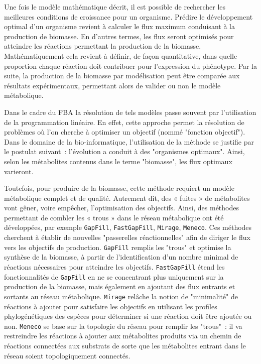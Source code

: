 \begin{refsegment}
    Une fois le modèle mathématique décrit, il est possible de rechercher les meilleures conditions de croissance pour un organisme. Prédire le développement optimal d’un organisme revient à calculer le flux maximum conduisant à la production de biomasse. En d’autres termes, les flux seront optimisés pour atteindre les réactions permettant la production de la biomasse. Mathématiquement cela revient à définir, de façon quantitative, dans quelle proportion chaque réaction doit contribuer pour l’expression du phénotype. Par la suite, la production de la biomasse par modélisation peut être comparée aux résultats expérimentaux, permettant alors de valider ou non le modèle métabolique.
    
    
    Dans le cadre du \gls{FBA} la résolution de tels modèles passe souvent par l’utilisation de la programmation linéaire. En effet, cette approche permet la résolution de problèmes où l’on cherche à optimiser un objectif (nommé "fonction objectif"). Dans le domaine de la bio-informatique, l’utilisation de la méthode se justifie par le postulat suivant : l’évolution a conduit à des "organismes optimaux". Ainsi, selon les métabolites contenus dans le terme "biomasse", les flux optimaux varieront.
    
    Toutefois, pour produire de la biomasse, cette méthode requiert un modèle métabolique complet et de qualité. Autrement dit, des « fuites » de métabolites vont gêner, voire empêcher, l’optimisation des objectifs. Ainsi, des méthodes permettant de combler les « trous » dans le réseau métabolique ont été développées, par exemple \texttt{GapFill}\cite{kumar2007optimization}, \texttt{FastGapFill}\cite{thiele2014fastgapfill}, \texttt{Mirage}\cite{vitkin2012mirage}, \texttt{Meneco}\cite{prigent2017meneco}. Ces méthodes cherchent à établir de nouvelles "passerelles réactionnelles" afin de diriger le flux vers les objectifs de production. \texttt{GapFill} remplis les "trous" et optimise la synthèse de la biomasse, à partir de l’identification d’un nombre minimal de réactions nécessaires pour atteindre les objectifs. \texttt{FastGapFill} étend les fonctionnalités de \texttt{GapFill} en ne se concentrant plus uniquement sur la production de la biomasse, mais également en ajoutant des flux entrants et sortants au réseau métabolique. \texttt{Mirage} relâche la notion de "minimalité" de réactions à ajouter pour satisfaire les objectifs en utilisant les profiles phylogénétiques des espèces pour déterminer si une réaction doit être ajoutée ou non. \texttt{Meneco} se base sur la topologie du réseau pour remplir les "trous" : il va restreindre les réactions à ajouter aux métabolites produits via un chemin de réactions connectées aux substrats de sorte que les métabolites entrant dans le réseau soient topologiquement connectés.
    

\end{refsegment}
